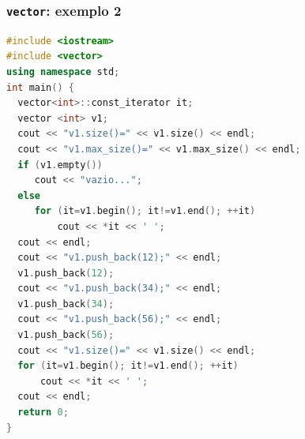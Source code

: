 \documentclass[xcolor={dvipsnames,table},aspectratio=169]{beamer}
\begin{document}
\begin{frame}[fragile]\frametitle{\texttt{vector}: exemplo 2}
\begin{lstlisting}[language=C++,basicstyle=\ttfamily\tiny]
#include <iostream>
#include <vector>
using namespace std;
int main() {
  vector<int>::const_iterator it;
  vector <int> v1;
  cout << "v1.size()=" << v1.size() << endl;
  cout << "v1.max_size()=" << v1.max_size() << endl;
  if (v1.empty())
     cout << "vazio...";
  else
     for (it=v1.begin(); it!=v1.end(); ++it)
         cout << *it << ' ';
  cout << endl;
  cout << "v1.push_back(12);" << endl;
  v1.push_back(12);
  cout << "v1.push_back(34);" << endl;
  v1.push_back(34);
  cout << "v1.push_back(56);" << endl;
  v1.push_back(56);
  cout << "v1.size()=" << v1.size() << endl;
  for (it=v1.begin(); it!=v1.end(); ++it)
      cout << *it << ' ';
  cout << endl;
  return 0;
}
\end{lstlisting}
\end{frame}
\end{document}

